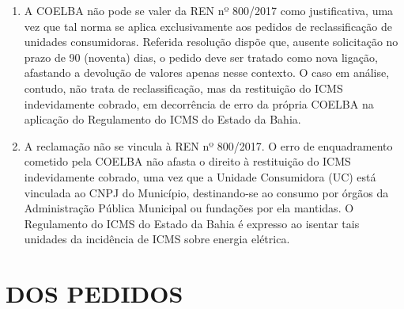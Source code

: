 \begin{enumerate}[resume]
    \item A COELBA não pode se valer da REN nº 800/2017 como justificativa, uma vez que tal norma se aplica exclusivamente aos pedidos de reclassificação de unidades consumidoras. Referida resolução dispõe que, ausente solicitação no prazo de 90 (noventa) dias, o pedido deve ser tratado como nova ligação, afastando a devolução de valores apenas nesse contexto. O caso em análise, contudo, não trata de reclassificação, mas da restituição do ICMS indevidamente cobrado, em decorrência de erro da própria COELBA na aplicação do Regulamento do ICMS do Estado da Bahia.

    \item A reclamação não se vincula à REN nº 800/2017. O erro de enquadramento cometido pela COELBA não afasta o direito à restituição do ICMS indevidamente cobrado, uma vez que a Unidade Consumidora (UC) está vinculada ao CNPJ do Município, destinando-se ao consumo por órgãos da Administração Pública Municipal ou fundações por ela mantidas. O Regulamento do ICMS do Estado da Bahia é expresso ao isentar tais unidades da incidência de ICMS sobre energia elétrica.
\end{enumerate}

\section{DOS PEDIDOS}

